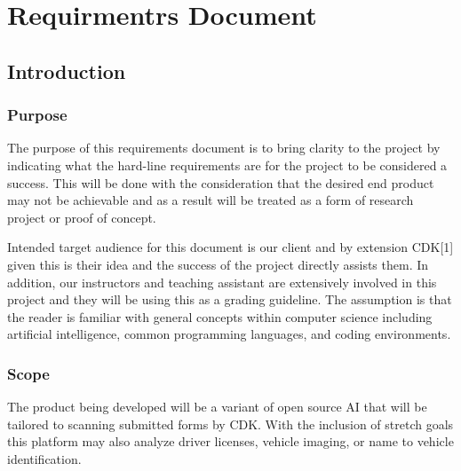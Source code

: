 \documentclass[article, onecolumn, draftclsnofoot,10pt, compsoc]{IEEEtran}
\begin{document}
\section{Requirmentrs Document}
\subsection{Introduction}
\subsubsection{Purpose}
The purpose of this requirements document is to bring clarity to the project by indicating what the hard-line requirements are for the project to be considered a success. This will be done with the consideration that the desired end product may not be achievable and as a result will be treated as a form of research project or proof of concept.

Intended target audience for this document is our client and by extension CDK[1] given this is their idea and the success of the project directly assists them. In addition, our instructors and teaching assistant are extensively involved in this project and they will be using this as a grading guideline. The assumption is that the reader is familiar with general concepts within computer science including artificial intelligence, common programming languages, and coding environments.


\subsubsection{Scope}
The product being developed will be a variant of open source AI that will be tailored to scanning submitted forms by CDK. With the inclusion of stretch goals this platform may also analyze driver licenses, vehicle imaging, or name to vehicle identification. 
\end{document}
